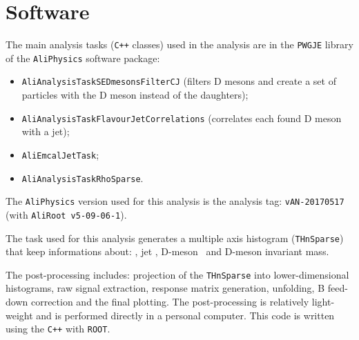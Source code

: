 \section{Software}

The main analysis tasks (\texttt{C++} classes) used in the analysis are in the \texttt{PWGJE} library of the \texttt{AliPhysics} software package:
\begin{itemize}
\item \texttt{AliAnalysisTaskSEDmesonsFilterCJ} (filters D mesons and create a set of particles with the D meson instead of the daughters);
\item \texttt{AliAnalysisTaskFlavourJetCorrelations} (correlates each found D meson with a jet);
\item \texttt{AliEmcalJetTask};
\item \texttt{AliAnalysisTaskRhoSparse}.
\end{itemize}
The \texttt{AliPhysics} version used for this analysis is the analysis tag: \texttt{vAN-20170517} (with \texttt{AliRoot v5-09-06-1}).

The task used for this analysis generates a multiple axis histogram (\texttt{THnSparse}) that keep informations about: \zpar, jet \pt, D-meson \pt\ and D-meson invariant mass.

The post-processing includes: projection of the \texttt{THnSparse} into lower-dimensional histograms, raw signal extraction, response matrix generation, unfolding, B feed-down correction and the final plotting.
The post-processing is relatively light-weight and is performed directly in a personal computer. This code is written using the \texttt{C++} with \texttt{ROOT}.

%

